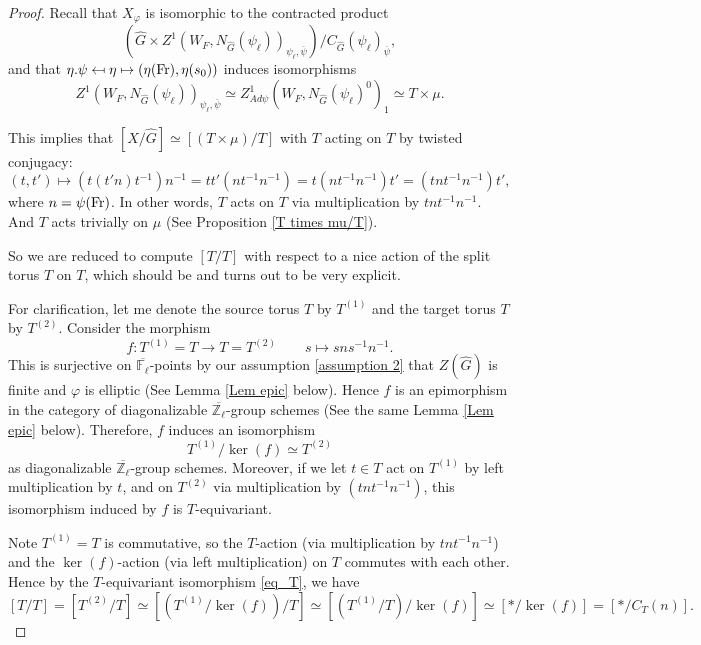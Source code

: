 \begin{proof}
	Recall that $X_{\varphi}$ is isomorphic to the contracted product 
	$$(\hat{G} \times Z^1(W_F, N_{\hat{G}}(\psi_{\ell}))_{\psi_{\ell}, \overline{\psi}})/C_{\hat{G}}(\psi_{\ell})_{\overline{\psi}},$$ 
	and that $\eta.\psi \mapsfrom \eta \mapsto (\eta(\operatorname{Fr}), \eta(s_0))$ induces isomorphisms
	$$Z^1(W_F, N_{\hat{G}}(\psi_{\ell}))_{\psi_{\ell}, \overline{\psi}} \simeq Z^1_{Ad\psi}(W_F, N_{\hat{G}}(\psi_{\ell})^0)_1 \simeq T \times \mu.$$
	
	This implies that $[X/\hat{G}] \simeq [(T \times \mu)/T]$ with $T$ acting on $T$ by twisted conjugacy:
	$$(t, t') \mapsto \left(t(t'n)t^{-1}\right)n^{-1}=tt'(nt^{-1}n^{-1})=t(nt^{-1}n^{-1})t'=(tnt^{-1}n^{-1})t',$$
	where $n=\psi(\operatorname{Fr})$. In other words, $T$ acts on $T$ via multiplication by $tnt^{-1}n^{-1}$. And $T$ acts trivially on $\mu$ (See Proposition \ref{T times mu/T}).
	
	So we are reduced to compute $[T/T]$ with respect to a nice action of the split torus $T$ on $T$, which should be and turns out to be very explicit.
	
	For clarification, let me denote the source torus $T$ by $T^{(1)}$ and the target torus $T$ by $T^{(2)}$. Consider the morphism
	$$f: T^{(1)} = T \longrightarrow T = T^{(2)} \qquad s \longmapsto sns^{-1}n^{-1}.$$
	This is surjective on $\overline{\mathbb{F}_{\ell}}$-points by our assumption \ref{assumption 2} that $Z(\hat{G})$ is finite and $\varphi$ is elliptic (See Lemma \ref{Lem epic} below). Hence $f$ is an epimorphism in the category of diagonalizable $\overline{\mathbb{Z}_{\ell}}$-group schemes (See the same Lemma \ref{Lem epic} below). Therefore, $f$ induces an isomorphism 
	\begin{equation}\label{eq_T}
		T^{(1)}/\ker(f) \simeq T^{(2)}
	\end{equation}
	as diagonalizable $\overline{\mathbb{Z}_{\ell}}$-group schemes. Moreover, if we let $t \in T$ act on $T^{(1)}$ by left multiplication by $t$, and on $T^{(2)}$ via multiplication by $(tnt^{-1}n^{-1})$, this isomorphism induced by $f$ is $T$-equivariant.
	
	Note $T^{(1)}=T$ is commutative, so the $T$-action (via multiplication by $tnt^{-1}n^{-1}$) and the $\ker(f)$-action (via left multiplication) on $T$ commutes with each other. Hence by the $T$-equivariant isomorphism \eqref{eq_T}, we have
	$$[T/T] = [T^{(2)}/T] \simeq \left[\left(T^{(1)}/\ker(f)\right)/T\right] \simeq \left[\left(T^{(1)}/T\right)/\ker(f)\right] \simeq [*/\ker(f)] = [*/C_T(n)].$$ 
	

\end{proof}
